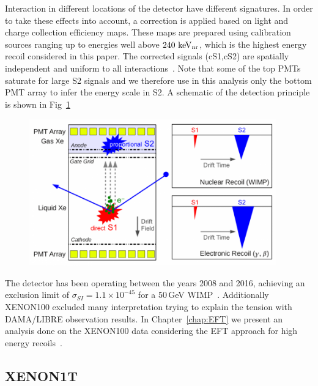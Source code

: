 Interaction in different locations of  the detector have different signatures. In order to take these effects into account, a correction is applied based on light and charge collection efficiency maps. These maps are prepared using calibration sources ranging up to energies well above $240~\mathrm{keV_\mathrm{nr}}$, which is the highest energy recoil considered in this paper. The corrected signals (cS1,cS2) are spatially independent and uniform to all interactions~\cite{xe100_instr2012}. Note that some of the top PMTs saturate for large S2 signals and we therefore use in this analysis only the bottom PMT array to infer the energy scale in S2. A schematic of the detection principle is shown in Fig~\ref{fig:xe100TPC}

\begin{figure}[]
	\centering
	\includegraphics[width=0.95\textwidth]{figs/xe100TPC.png}
	\label{fig:xe100TPC}
\end{figure}

The detector has been operating between the years 2008 and 2016, achieving an exclusion limit of $\sigma_{SI} = 1.1 \times 10^{-45}$ for a 50\,GeV WIMP~\cite{xe100_run_combination}. Additionally XENON100 excluded many interpretation trying to explain the tension with DAMA/LIBRE observation results. In Chapter~\ref{chap:EFT} we present an analysis done on the XENON100 data considering the EFT approach for high energy recoils~\cite{Aprile:2017aas}.  

\subsection{XENON1T}
\label{sec:xe1T}

